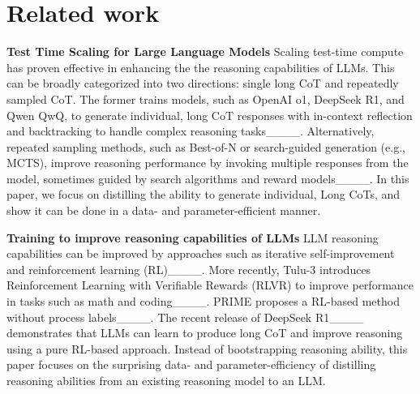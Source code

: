 \section{Related work}
\textbf{Test Time Scaling for Large Language Models}
Scaling test-time compute has proven effective in enhancing the the reasoning capabilities of LLMs. 
This can be broadly categorized into two directions: single long CoT and repeatedly sampled CoT. The former trains models, such as OpenAI o1, DeepSeek R1, and Qwen QwQ, to generate individual, long CoT responses with in-context reflection and backtracking to handle complex reasoning tasks____. 
Alternatively, repeated sampling methods, such as Best-of-N or search-guided generation (e.g., MCTS), improve reasoning performance by invoking multiple responses from the model, sometimes guided by search algorithms and reward models____. In this paper, we focus on distilling the ability to generate individual, Long CoTs, and show it can be done in a data- and parameter-efficient manner. 

\textbf{Training to improve reasoning capabilities of LLMs}
LLM reasoning capabilities can be improved by approaches such as iterative self-improvement and reinforcement learning (RL)____. More recently, Tulu-3 introduces Reinforcement Learning with Verifiable Rewards (RLVR) to improve performance in tasks such as math and coding____. PRIME proposes a RL-based method without process labels____. The recent release of DeepSeek R1____ demonstrates that LLMs can learn to produce long CoT and improve reasoning using a pure RL-based approach. 
Instead of bootstrapping reasoning ability, this paper focuses on the surprising data- and parameter-efficiency of distilling reasoning abilities from an existing reasoning model to an LLM. 




